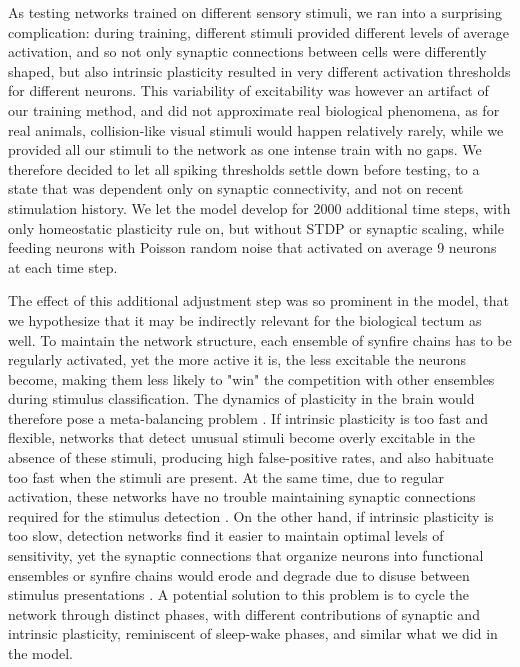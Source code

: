 \documentclass{article}
\begin{document}
As testing networks trained on different sensory stimuli, we ran into a surprising complication: during training, different stimuli provided different levels of average activation, and so not only synaptic connections between cells were differently shaped, but also intrinsic plasticity resulted in very different activation thresholds for different neurons. This variability of excitability was however an artifact of our training method, and did not approximate real biological phenomena, as for real animals, collision-like visual stimuli would happen relatively rarely, while we provided all our stimuli to the network as one intense train with no gaps. We therefore decided to let all spiking thresholds settle down before testing, to a state that was dependent only on synaptic connectivity, and not on recent stimulation history. We let the model develop for 2000 additional time steps, with only homeostatic plasticity rule on, but without STDP or synaptic scaling, while feeding neurons with Poisson random noise that activated on average 9 neurons at each time step. 

The effect of this additional adjustment step was so prominent in the model, that we hypothesize that it may be indirectly relevant for the biological tectum as well. To maintain the network structure, each ensemble of synfire chains has to be regularly activated, yet the more active it is, the less excitable the neurons become, making them less likely to "win" the competition with other ensembles during stimulus classification. The dynamics of plasticity in the brain would therefore pose a meta-balancing problem \citep{zenke2017temporal}. If intrinsic plasticity is too fast and flexible, networks that detect unusual stimuli become overly excitable in the absence of these stimuli, producing high false-positive rates, and also habituate too fast when the stimuli are present. At the same time, due to regular activation, these networks have no trouble maintaining synaptic connections required for the stimulus detection \citep{litwin2014assemblies}. On the other hand, if intrinsic plasticity is too slow, detection networks find it easier to maintain optimal levels of sensitivity, yet the synaptic connections that organize neurons into functional ensembles or synfire chains would erode and degrade due to disuse between stimulus presentations \citep{triplett2018emergence}. A potential solution to this problem is to cycle the network through distinct phases, with different contributions of synaptic and intrinsic plasticity, reminiscent of sleep-wake phases, and similar what we did in the model.
\end{document}

